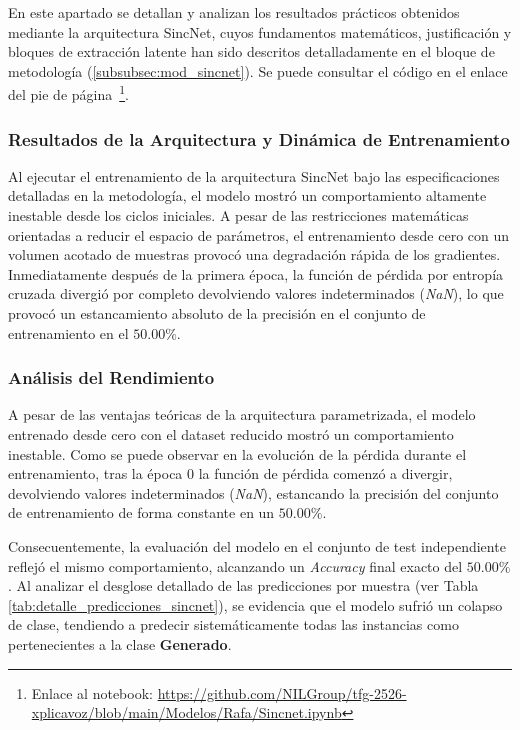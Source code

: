 En este apartado se detallan y analizan los resultados prácticos obtenidos mediante la arquitectura SincNet, cuyos fundamentos matemáticos, justificación y bloques de extracción latente han sido descritos detalladamente en el bloque de metodología (\autoref{subsubsec:mod_sincnet}). Se puede consultar el código en el enlace del pie de página~\footnote{Enlace al notebook: \url{https://github.com/NILGroup/tfg-2526-xplicavoz/blob/main/Modelos/Rafa/Sincnet.ipynb}}.

\subsubsection*{Resultados de la Arquitectura y Dinámica de Entrenamiento}

Al ejecutar el entrenamiento de la arquitectura SincNet bajo las especificaciones detalladas en la metodología, el modelo mostró un comportamiento altamente inestable desde los ciclos iniciales. A pesar de las restricciones matemáticas orientadas a reducir el espacio de parámetros, el entrenamiento desde cero con un volumen acotado de muestras provocó una degradación rápida de los gradientes. Inmediatamente después de la primera época, la función de pérdida por entropía cruzada divergió por completo devolviendo valores indeterminados (\textit{NaN}), lo que provocó un estancamiento absoluto de la precisión en el conjunto de entrenamiento en el $50.00\%$.

\subsubsection*{Análisis del Rendimiento}

A pesar de las ventajas teóricas de la arquitectura parametrizada, el modelo entrenado desde cero con el dataset reducido mostró un comportamiento inestable. Como se puede observar en la evolución de la pérdida durante el entrenamiento, tras la época 0 la función de pérdida comenzó a divergir, devolviendo valores indeterminados (\textit{NaN}), estancando la precisión del conjunto de entrenamiento de forma constante en un $50.00\%$.

Consecuentemente, la evaluación del modelo en el conjunto de test independiente reflejó el mismo comportamiento, alcanzando un \textit{Accuracy} final exacto del $50.00\%$. Al analizar el desglose detallado de las predicciones por muestra (ver Tabla \ref{tab:detalle_predicciones_sincnet}), se evidencia que el modelo sufrió un colapso de clase, tendiendo a predecir sistemáticamente todas las instancias como pertenecientes a la clase \textbf{Generado}.

